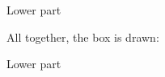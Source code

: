 \begin{itembox}
\begin{testbox}[
  finishcomment={10.~finish}]
\lipsum[2]
\tcblower
Lower part
\end{testbox}
\tcblower
\item{}
\end{itembox}

All together, the box is drawn:
\begin{dispExample}
\begin{testbox}
\lipsum[2]
\tcblower
Lower part
\end{testbox}
\end{dispExample}

\egroup
